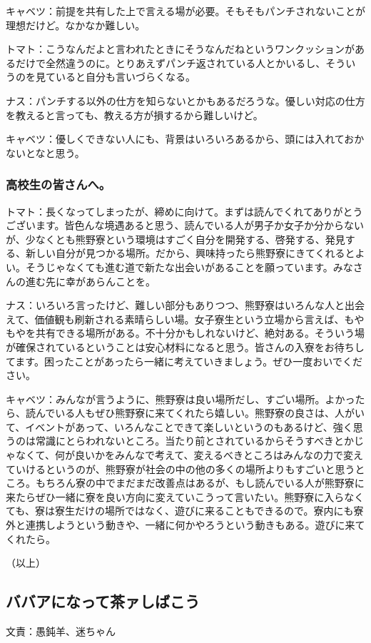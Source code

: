 キャベツ：前提を共有した上で言える場が必要。そもそもパンチされないことが理想だけど。なかなか難しい。

トマト：こうなんだよと言われたときにそうなんだねというワンクッションがあるだけで全然違うのに。とりあえずパンチ返されている人とかいるし、そういうのを見ていると自分も言いづらくなる。

ナス：パンチする以外の仕方を知らないとかもあるだろうな。優しい対応の仕方を教えると言っても、教える方が損するから難しいけど。

キャベツ：優しくできない人にも、背景はいろいろあるから、頭には入れておかないとなと思う。

\subsubsection{高校生の皆さんへ。}
トマト：長くなってしまったが、締めに向けて。まずは読んでくれてありがとうございます。皆色んな境遇あると思う、読んでいる人が男子か女子か分からないが、少なくとも熊野寮という環境はすごく自分を開発する、啓発する、発見する、新しい自分が見つかる場所。だから、興味持ったら熊野寮にきてくれるとよい。そうじゃなくても進む道で新たな出会いがあることを願っています。みなさんの進む先に幸があらんことを。　

ナス：いろいろ言ったけど、難しい部分もありつつ、熊野寮はいろんな人と出会えて、価値観も刷新される素晴らしい場。女子寮生という立場から言えば、もやもやを共有できる場所がある。不十分かもしれないけど、絶対ある。そういう場が確保されているということは安心材料になると思う。皆さんの入寮をお待ちしてます。困ったことがあったら一緒に考えていきましょう。ぜひ一度おいでください。

キャベツ：みんなが言うように、熊野寮は良い場所だし、すごい場所。よかったら、読んでいる人もぜひ熊野寮に来てくれたら嬉しい。熊野寮の良さは、人がいて、イベントがあって、いろんなことできて楽しいというのもあるけど、強く思うのは常識にとらわれないところ。当たり前とされているからそうすべきとかじゃなくて、何が良いかをみんなで考えて、変えるべきところはみんなの力で変えていけるというのが、熊野寮が社会の中の他の多くの場所よりもすごいと思うところ。もちろん寮の中でまだまだ改善点はあるが、もし読んでいる人が熊野寮に来たらぜひ一緒に寮を良い方向に変えていこうって言いたい。熊野寮に入らなくても、寮は寮生だけの場所ではなく、遊びに来ることもできるので。寮内にも寮外と連携しようという動きや、一緒に何かやろうという動きもある。遊びに来てくれたら。

（以上）

\newpage

\subsection{ババアになって茶ァしばこう}
\begin{flushright}
  文責：愚鈍羊、迷ちゃん
\end{flushright}

